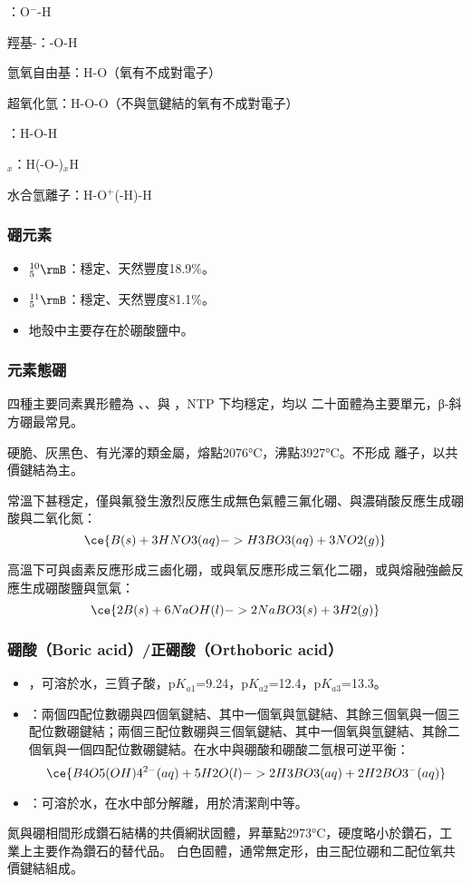 \documentclass[a4paper,12pt]{report}
\begin{document}
\bit
\item {}：O$^-$-H
\item 羥基-：-O-H
\item 氫氧自由基：H-O（氧有不成對電子）
\item 超氧化氫：H-O-O（不與氫鍵結的氧有不成對電子）
\item {}：H-O-H
\item {}$_x$：H(-O-)$_x$H
\item 水合氫離子：H-O$^+$(-H)-H
\eit
{}
\subsubsection{硼元素}
\begin{itemize}
\item $^{10}_5\rmB$：穩定、天然豐度18.9\%。
\item $^{11}_5\rmB$：穩定、天然豐度81.1\%。
\item 地殼中主要存在於硼酸鹽中。
\end{itemize}
\subsubsection{元素態硼}
\bit
\item 四種主要同素異形體為 、、與 ，NTP 下均穩定，均以  二十面體為主要單元，β-斜方硼最常見。
\item 硬脆、灰黑色、有光澤的類金屬，熔點2076°C，沸點3927°C。不形成  離子，以共價鍵結為主。
\item 常溫下甚穩定，僅與氟發生激烈反應生成無色氣體三氟化硼、與濃硝酸反應生成硼酸與二氧化氮：
\[\ce{B(s) + 3HNO3(aq) -> H3BO3(aq) + 3NO2(g)}\]
\item 高溫下可與鹵素反應形成三鹵化硼，或與氧反應形成三氧化二硼，或與熔融強鹼反應生成硼酸鹽與氫氣：
\[\ce{2B(s) + 6NaOH(l) -> 2NaBO3(s) + 3H2(g)}\]
\eit
\subsubsection{硼酸（Boric acid）/正硼酸（Orthoboric acid）}
\begin{itemize}
\item {}，可溶於水，三質子酸，p$K_{a1}$=9.24，p$K_{a2}$=12.4，p$K_{a3}$=13.3。
\item {}：兩個四配位數硼與四個氧鍵結、其中一個氧與氫鍵結、其餘三個氧與一個三配位數硼鍵結；兩個三配位數硼與三個氧鍵結、其中一個氧與氫鍵結、其餘二個氧與一個四配位數硼鍵結。在水中與硼酸和硼酸二氫根可逆平衡：
\[\ce{B4O5(OH)4^{2-}(aq) + 5H2O(l) -> 2H3BO3(aq) + 2H2BO3^-(aq)}\]
\item {}：可溶於水，在水中部分解離，用於清潔劑中等。
\end{itemize}
氮與硼相間形成鑽石結構的共價網狀固體，昇華點2973°C，硬度略小於鑽石，工業上主要作為鑽石的替代品。
白色固體，通常無定形，由三配位硼和二配位氧共價鍵結組成。
\end{document}
